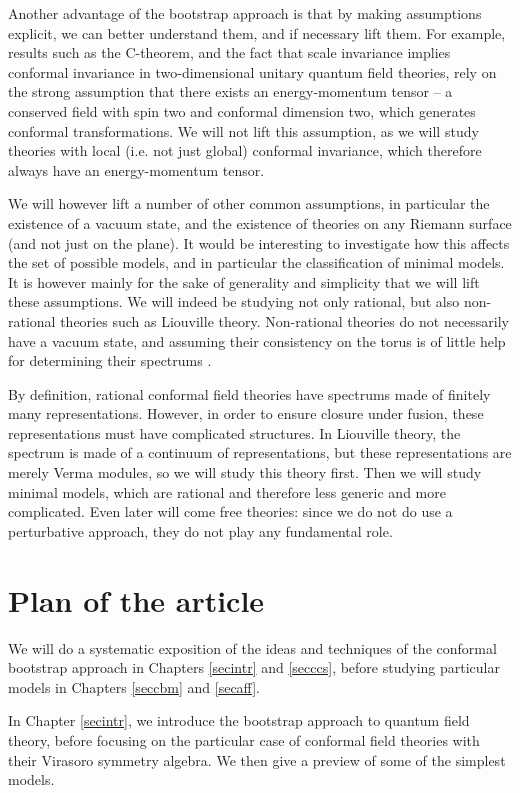 \documentclass[12pt, a4paper, notitlepage, twoside]{report}
\numberwithin{equation}{section}
\theoremstyle{break}
\begin{document}
Another advantage of the bootstrap approach is that by making assumptions explicit, we can better understand them, and if necessary lift them.
For example, results such as the C-theorem, and the fact that scale invariance implies conformal invariance in two-dimensional unitary quantum field theories, rely on the strong assumption that there exists an energy-momentum tensor -- a conserved field with spin two and conformal dimension two, which generates conformal transformations.
We will not lift this assumption, as we will study theories with local (i.e.
not just global) conformal invariance, which therefore always have an energy-momentum tensor.

We will however lift a number of other common assumptions, in particular the existence of a vacuum state, and the existence of theories on any Riemann surface (and not just on the plane).
It would be interesting to investigate how this affects the set of possible models, and in particular the classification of minimal models.
It is however mainly for the sake of generality and simplicity that
we will lift these assumptions.
We will indeed be studying not only rational, but also non-rational theories such as Liouville theory.
Non-rational theories do not necessarily have a vacuum state, and assuming their consistency on the torus is of little help for determining their spectrums \cite{rib14c}. 

By definition, rational conformal field theories have spectrums made of finitely many representations.
However, in order to ensure closure under fusion, these representations must have complicated structures.
In Liouville theory, the spectrum is made of a continuum of representations, but these representations are merely Verma modules, so we will study this theory first.
Then we will study minimal models, which are rational and therefore less generic and more complicated.
Even later will come free theories: since we do not do use a perturbative approach, they do not play any fundamental role. 


\section{Plan of the article \label{secplan}}

We will do a systematic exposition of the ideas and techniques of the conformal bootstrap approach in Chapters \ref{secintr} and \ref{secccs}, before studying particular models in Chapters \ref{seccbm} and \ref{secaff}.

In Chapter \ref{secintr}, we introduce the bootstrap approach to quantum field theory, before focusing on the particular case of conformal field theories with their Virasoro symmetry algebra.
We then give a preview of some of the simplest models.
\end{document}
